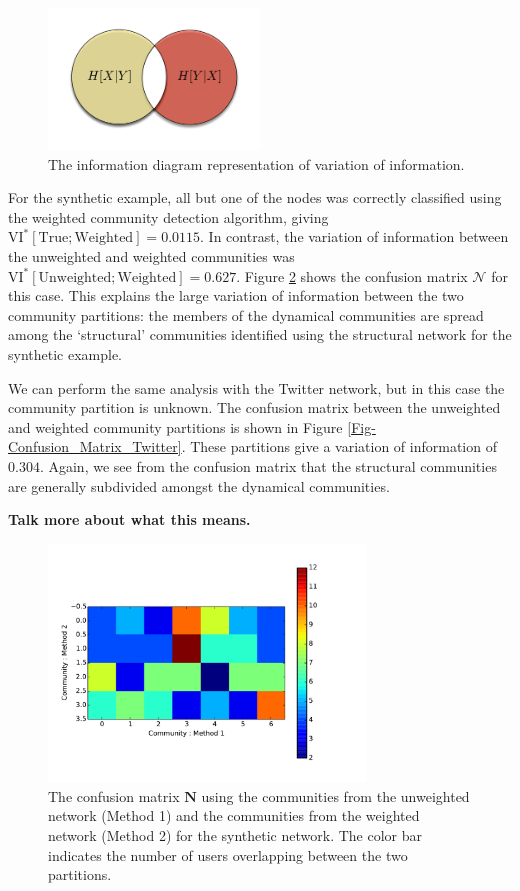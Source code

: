 \documentclass[12pt]{article}
\begin{document}
\begin{figure}[h!]
  \centering
\includegraphics[width=0.50\textwidth]{Figures/Variation-of-Information.png}
\caption{The information diagram representation of variation of information.}
\label{Fig-Information_Diagram}
\end{figure}

For the synthetic example, all but one of the nodes was correctly classified using the weighted community detection algorithm, giving $\text{VI}^{*}[\text{True}; \text{Weighted}] = 0.0115$. In contrast, the variation of information between the unweighted and weighted communities was $\text{VI}^{*}[\text{Unweighted}; \text{Weighted}] = 0.627$. Figure \ref{Fig-Confusion_Matrix_Synthetic} shows the confusion matrix $\mathcal{N}$ for this case. This explains the large variation of information between the two community partitions: the members of the dynamical communities are spread among the `structural' communities identified using the structural network for the synthetic example.

We can perform the same analysis with the Twitter network, but in this case the community partition is unknown. The confusion matrix between the unweighted and weighted community partitions is shown in Figure \ref{Fig-Confusion_Matrix_Twitter}. These partitions give a variation of information of $0.304$. Again, we see from the confusion matrix that the structural communities are generally subdivided amongst the dynamical communities.

\textbf{Talk more about what this means.}

\begin{figure}[h!]
  \centering
\includegraphics[width=0.75\textwidth]{Figures/confusion_matrix-synthetic.pdf}
\caption{The confusion matrix $\mathbf{N}$ using the communities from the unweighted network (Method 1) and the communities from the weighted network (Method 2) for the synthetic network. The color bar indicates the number of users overlapping between the two partitions.}
\label{Fig-Confusion_Matrix_Synthetic}
\end{figure}
\end{document}
